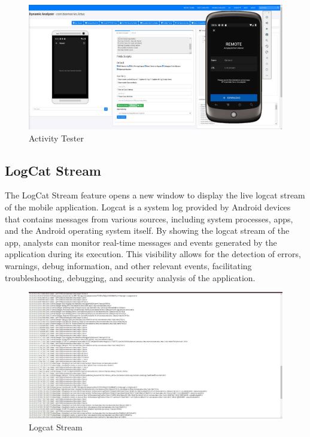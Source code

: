 \documentclass{report}
\begin{document}
\begin{figure}[hbt!]
    \centering
    \includegraphics[width=1\linewidth]{Dynamic Analyzer/activitytester.jpg}
    \caption{Activity Tester}
    \label{fig:example}
\end{figure}
\FloatBarrier

\subsection{LogCat Stream}
The LogCat Stream feature opens a new window to display the live logcat stream of the mobile application. Logcat is a system log provided by Android devices that contains messages from various sources, including system processes, apps, and the Android operating system itself. By showing the logcat stream of the app, analysts can monitor real-time messages and events generated by the application during its execution. This visibility allows for the detection of errors, warnings, debug information, and other relevant events, facilitating troubleshooting, debugging, and security analysis of the application.

 \begin{figure}[hbt!]
    \centering
    \includegraphics[width=1\linewidth]{Dynamic Analyzer/logcat.jpg}
    \caption{Logcat Stream}
    \label{fig:example}
\end{figure}
\FloatBarrier
 
\end{document}
